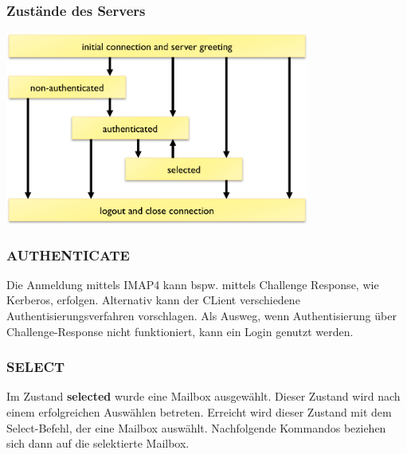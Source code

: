 \documentclass{article} %
\begin{document}
\subsubsection{Zustände des Servers}
\begin{center}
	\includegraphics[width=10cm]{img/imap.png}
\end{center}
\subsubsection{AUTHENTICATE}
Die Anmeldung mittels IMAP4 kann bspw. mittels Challenge Response, wie Kerberos, erfolgen. Alternativ kann der CLient verschiedene Authentisierungsverfahren vorschlagen. Als Ausweg, wenn Authentisierung über Challenge-Response nicht funktioniert, kann ein Login genutzt werden.
\subsubsection{SELECT}
Im Zustand \textbf{selected} wurde eine Mailbox ausgewählt. Dieser Zustand wird nach einem erfolgreichen Auswählen betreten. Erreicht wird dieser Zustand mit dem Select-Befehl, der eine Mailbox auswählt. Nachfolgende Kommandos beziehen sich dann auf die selektierte Mailbox.
\end{document}
